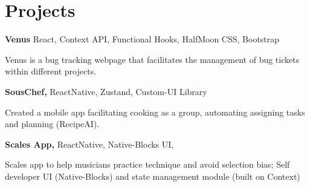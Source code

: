 
\newenvironment{twocolentry_proj}[2][]{
    \onecolentry
    \def\secondColumn{#2}
    \setcolumnwidth{\fill, 6.2 cm}
    \begin{paracol}{2}
}{
    \switchcolumn \raggedleft \secondColumn
    \end{paracol}
    \endonecolentry
} %

\vspace{5 pt - 0.5 cm}
\section{Projects}
\begin{twocolentry_proj}{
    \mbox{}%
}
\textbf{Venus} React, Context API, Functional Hooks, HalfMoon CSS, Bootstrap
\end{twocolentry_proj}

\begin{onecolentry}
    \begin{highlights}
        \item Venus is a bug tracking webpage that facilitates the management of bug tickets within different projects. 
    \end{highlights}
\end{onecolentry}

\vspace{0.10 cm}
\begin{twocolentry_proj}{
    \mbox{}%
}
\textbf{SousChef,} ReactNative, Zustand, Custom-UI Library  
\end{twocolentry_proj}
\begin{onecolentry}
    \begin{highlights}
        \item Created a mobile app facilitating cooking as a group, automating assigning tasks and planning (RecipeAI).
    \end{highlights}
\end{onecolentry}

\vspace{0.10 cm}
\begin{twocolentry_proj}{
    \mbox{}%
}
\textbf{Scales App,} ReactNative, Native-Blocks UI, 
\end{twocolentry_proj}
\begin{onecolentry}
    \begin{highlights}
        \item Scales app to help musicians practice technique and avoid selection bias; Self developer UI (Native-Blocks) and state management module (built on Context)
    \end{highlights}
\end{onecolentry}